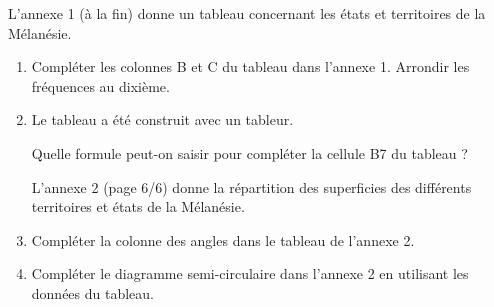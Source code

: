 
\medskip

L'annexe 1 (à la fin) donne un tableau concernant les états et territoires de la Mélanésie.
\medskip

\begin{enumerate}
\item Compléter les colonnes B et C du tableau dans l'annexe 1. Arrondir les fréquences au dixième.
\item Le tableau a été construit avec un tableur.

Quelle formule peut-on saisir pour compléter la cellule B7 du tableau ?

L'annexe 2 (page 6/6) donne la répartition des superficies des différents territoires et états de la Mélanésie.

\item Compléter la colonne des angles dans le tableau de l'annexe 2.
\item Compléter le diagramme semi-circulaire dans l'annexe 2 en utilisant les données du tableau.
\end{enumerate}

